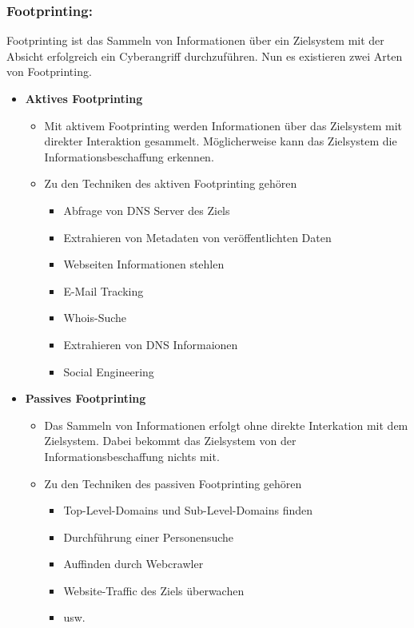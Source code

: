 \subsubsection{Footprinting:}
Footprinting ist das Sammeln von Informationen über ein Zielsystem mit der Absicht erfolgreich ein Cyberangriff durchzuführen. Nun es existieren zwei Arten von Footprinting.\cite{ref_url14} 
\begin{itemize}
    \item \textbf{Aktives Footprinting}
    \begin{itemize}
        \item Mit aktivem Footprinting werden Informationen über das Zielsystem mit direkter Interaktion gesammelt. Möglicherweise kann das Zielsystem die Informationsbeschaffung erkennen. 
        \item Zu den Techniken des aktiven Footprinting gehören
        \begin{itemize}
            \item Abfrage von DNS Server des Ziels
            \item Extrahieren von Metadaten von veröffentlichten Daten
            \item Webseiten Informationen stehlen
            \item E-Mail Tracking
            \item Whois-Suche
            \item Extrahieren von DNS Informaionen
            \item Social Engineering 
        \end{itemize}
    \end{itemize}\bigbreak
    \item \textbf{Passives Footprinting}
    \begin{itemize}
        \item Das Sammeln von Informationen erfolgt ohne direkte Interkation mit dem Zielsystem. Dabei bekommt das Zielsystem von der Informationsbeschaffung nichts mit.
        \item Zu den Techniken des passiven Footprinting gehören
        \begin{itemize}
            \item Top-Level-Domains und Sub-Level-Domains finden
            \item Durchführung einer Personensuche
            \item Auffinden durch Webcrawler
            \item Website-Traffic des Ziels überwachen
            \item usw.
        \end{itemize}
    \end{itemize}
\end{itemize}\cite{ref_url13}
